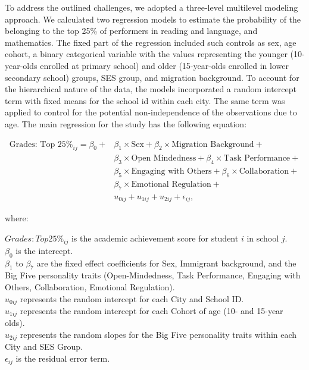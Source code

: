\documentclass[
  12pt,
  a4paper,
]{article}
\begin{document}
To address the outlined challenges, we adopted a three-level multilevel
modeling approach. We calculated two regression models to estimate the
probability of the belonging to the top 25\% of performers in reading
and language, and mathematics. The fixed part of the regression included
such controls as sex, age cohort, a binary categorical variable with the
values representing the younger (10-year-olds enrolled at primary
school) and older (15-year-olds enrolled in lower secondary school)
groups, SES group, and migration background. To account for the
hierarchical nature of the data, the models incorporated a random
intercept term with fixed means for the school id within each city. The
same term was applied to control for the potential non-independence of
the observations due to age. The main regression for the study has the
following equation:

\begin{equation}
\begin{aligned}
\text{Grades: Top 25\%}_{ij} = \beta_0 + & \beta_1 \times \text{Sex} + \beta_2 \times \text{Migration Background} + \\
& \beta_3 \times \text{Open Mindedness} + \beta_4 \times \text{Task Performance} + \\
& \beta_5 \times \text{Engaging with Others} + \beta_6 \times \text{Collaboration} + \\
& \beta_7 \times \text{Emotional Regulation} + \\
& u_{0ij} + u_{1ij} + u_{2ij} + \epsilon_{ij},
\end{aligned}
\end{equation}

where:

\(Grades: Top 25\%_{ij}\) is the academic achievement score for student
\(i\) in school \(j\).\\
\(\beta_0\) is the intercept.\\
\(\beta_1\) to \(\beta_7\) are the fixed effect coefficients for Sex,
Immigrant background, and the Big Five personality traits
(Open-Mindedness, Task Performance, Engaging with Others, Collaboration,
Emotional Regulation).\\
\(u_{0ij}\) represents the random intercept for each City and School
ID.\\
\(u_{1ij}\) represents the random intercept for each Cohort of age (10-
and 15-year olds).\\
\(u_{2ij}\) represents the random slopes for the Big Five personality
traits within each City and SES Group.\\
\(\epsilon_{ij}\) is the residual error term.
\end{document}
